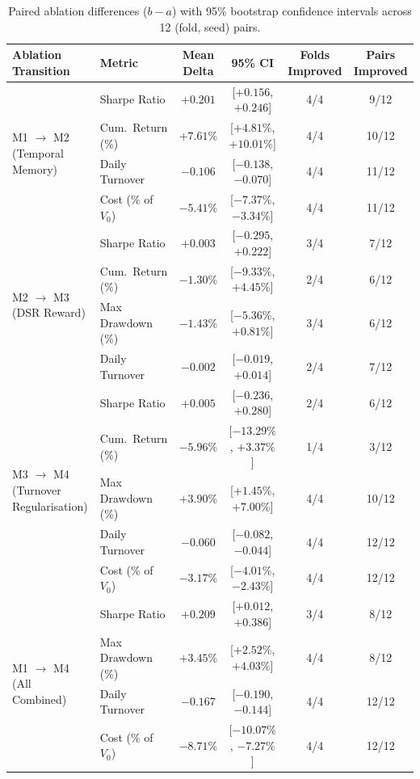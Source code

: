 \documentclass[11pt,a4paper]{article}
\numberwithin{equation}{section}
\numberwithin{table}{section}
\numberwithin{figure}{section}
\numberwithin{algorithm}{section}
\begin{document}
\begin{table}[!htbp]
\centering\footnotesize
\caption{Paired ablation differences ($b-a$) with 95\% bootstrap confidence intervals across 12 (fold, seed) pairs.}\label{tab:delta}
\setlength{\tabcolsep}{3pt}
\begin{tabular}{@{}p{3.0cm}lcccc@{}}
\toprule
Ablation Transition & Metric & Mean Delta & 95\% CI & Folds Improved & Pairs Improved\\
\midrule
\multirow{4}{3cm}{M1 $\to$ M2 (Temporal Memory)} & Sharpe Ratio & $+0.201$ & [$+0.156$, $+0.246$] & 4/4 & 9/12\\
 & Cum.\ Return (\%) & $+7.61\%$ & [$+4.81\%$, $+10.01\%$] & 4/4 & 10/12\\
 & Daily Turnover & $-0.106$ & [$-0.138$, $-0.070$] & 4/4 & 11/12\\
 & Cost (\% of $V_0$) & $-5.41\%$ & [$-7.37\%$, $-3.34\%$] & 4/4 & 11/12\\
\midrule
\multirow{4}{3cm}{M2 $\to$ M3 (DSR Reward)} & Sharpe Ratio & $+0.003$ & [$-0.295$, $+0.222$] & 3/4 & 7/12\\
 & Cum.\ Return (\%) & $-1.30\%$ & [$-9.33\%$, $+4.45\%$] & 2/4 & 6/12\\
 & Max Drawdown (\%) & $-1.43\%$ & [$-5.36\%$, $+0.81\%$] & 3/4 & 6/12\\
 & Daily Turnover & $-0.002$ & [$-0.019$, $+0.014$] & 2/4 & 7/12\\
\midrule
\multirow{5}{3cm}{M3 $\to$ M4 (Turnover Regularisation)} & Sharpe Ratio & $+0.005$ & [$-0.236$, $+0.280$] & 2/4 & 6/12\\
 & Cum.\ Return (\%) & $-5.96\%$ & [$-13.29\%$, $+3.37\%$] & 1/4 & 3/12\\
 & Max Drawdown (\%) & $+3.90\%$ & [$+1.45\%$, $+7.00\%$] & 4/4 & 10/12\\
 & Daily Turnover & $-0.060$ & [$-0.082$, $-0.044$] & 4/4 & 12/12\\
 & Cost (\% of $V_0$) & $-3.17\%$ & [$-4.01\%$, $-2.43\%$] & 4/4 & 12/12\\
\midrule
\multirow{4}{3cm}{M1 $\to$ M4 (All Combined)} & Sharpe Ratio & $+0.209$ & [$+0.012$, $+0.386$] & 3/4 & 8/12\\
 & Max Drawdown (\%) & $+3.45\%$ & [$+2.52\%$, $+4.03\%$] & 4/4 & 8/12\\
 & Daily Turnover & $-0.167$ & [$-0.190$, $-0.144$] & 4/4 & 12/12\\
 & Cost (\% of $V_0$) & $-8.71\%$ & [$-10.07\%$, $-7.27\%$] & 4/4 & 12/12\\
\bottomrule
\end{tabular}
\end{table}
\end{document}

